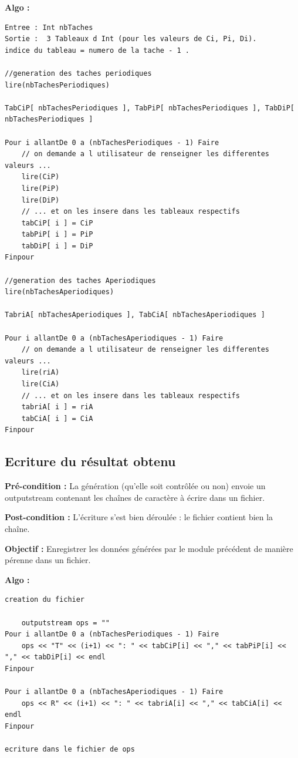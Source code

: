 			\textbf{Algo :} 
			\begin{lstlisting}
Entree : Int nbTaches
Sortie :  3 Tableaux d Int (pour les valeurs de Ci, Pi, Di). 
indice du tableau = numero de la tache - 1 .

//generation des taches periodiques
lire(nbTachesPeriodiques)

TabCiP[ nbTachesPeriodiques ], TabPiP[ nbTachesPeriodiques ], TabDiP[ nbTachesPeriodiques ]
		
Pour i allantDe 0 a (nbTachesPeriodiques - 1) Faire
	// on demande a l utilisateur de renseigner les differentes valeurs ...
	lire(CiP)
	lire(PiP)
	lire(DiP)        
	// ... et on les insere dans les tableaux respectifs
	tabCiP[ i ] = CiP
	tabPiP[ i ] = PiP
	tabDiP[ i ] = DiP
Finpour

//generation des taches Aperiodiques
lire(nbTachesAperiodiques)

TabriA[ nbTachesAperiodiques ], TabCiA[ nbTachesAperiodiques ]
		
Pour i allantDe 0 a (nbTachesAperiodiques - 1) Faire
	// on demande a l utilisateur de renseigner les differentes valeurs ...
	lire(riA)
	lire(CiA)        
	// ... et on les insere dans les tableaux respectifs
	tabriA[ i ] = riA
	tabCiA[ i ] = CiA
Finpour

			\end{lstlisting}

		\subsection{Ecriture du résultat obtenu}
			\textbf{Pré-condition :} La génération (qu'elle soit contrôlée ou non) envoie un outputstream contenant les chaînes de caractère à écrire dans un fichier.
		
			\textbf{Post-condition :} L'écriture s'est bien déroulée : le fichier contient bien la chaîne.
		
			\textbf{Objectif :} Enregistrer les données générées par le module précédent de manière pérenne dans un fichier.
		
			\textbf{Algo :}
			\begin{lstlisting}
creation du fichier

	outputstream ops = ""
Pour i allantDe 0 a (nbTachesPeriodiques - 1) Faire
	ops << "T" << (i+1) << ": " << tabCiP[i] << "," << tabPiP[i] << "," << tabDiP[i] << endl
Finpour

Pour i allantDe 0 a (nbTachesAperiodiques - 1) Faire
	ops << R" << (i+1) << ": " << tabriA[i] << "," << tabCiA[i] << endl
Finpour

ecriture dans le fichier de ops
  
		\end{lstlisting}
	
